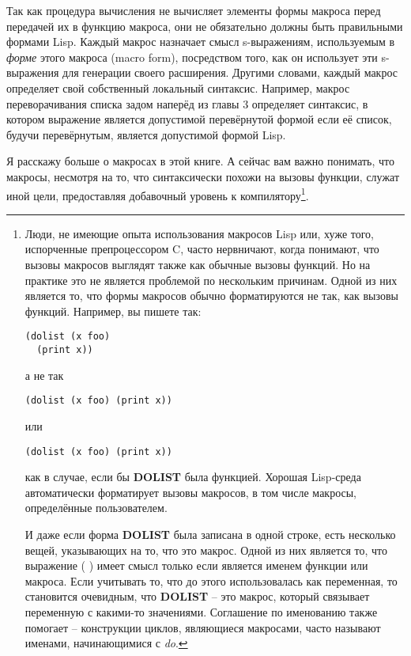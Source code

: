 Так как процедура вычисления не вычисляет элементы формы макроса перед передачей их в
функцию макроса, они не обязательно должны быть правильными формами Lisp. Каждый макрос
назначает смысл s-выражениям, используемым в \textit{форме} этого макроса (macro form),
посредством того, как он использует эти s-выражения для генерации своего
расширения. Другими словами, каждый макрос определяет свой собственный локальный
синтаксис. Например, макрос переворачивания списка задом наперёд из главы 3 определяет
синтаксис, в котором выражение является допустимой перевёрнутой формой если её список,
будучи перевёрнутым, является допустимой формой Lisp.

Я расскажу больше о макросах в этой книге. А сейчас вам важно понимать, что макросы,
несмотря на то, что синтаксически похожи на вызовы функции, служат иной цели, предоставляя
добавочный уровень к компилятору\footnote{Люди, не имеющие опыта использования макросов
  Lisp или, хуже того, испорченные препроцессором C, часто нервничают, когда понимают, что
  вызовы макросов выглядят также как обычные вызовы функций. Но на практике это не
  является проблемой по нескольким причинам. Одной из них является то, что формы макросов
  обычно форматируются не так, как вызовы функций. Например, вы пишете так:

\begin{lstlisting}
(dolist (x foo)
  (print x))
\end{lstlisting}

а не так

\begin{lstlisting}
(dolist (x foo) (print x))
\end{lstlisting}

или 

\begin{lstlisting}
(dolist (x foo) (print x))
\end{lstlisting}

как в случае, если бы \textbf{DOLIST} была функцией. Хорошая Lisp-среда автоматически
форматирует вызовы макросов, в том числе макросы, определённые пользователем.

И даже если форма \textbf{DOLIST} была записана в одной строке, есть несколько вещей,
указывающих на то, что это макрос. Одной из них является то, что выражение (
) имеет смысл только если  является именем функции или макроса. Если
учитывать то, что до этого  использовалась как переменная, то становится
очевидным, что \textbf{DOLIST} -- это макрос, который связывает переменную  с
какими-то значениями. Соглашение по именованию также помогает -- конструкции циклов,
являющиеся макросами, часто называют именами, начинающимися с \textit{do}.}.

